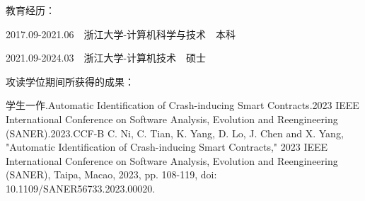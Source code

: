 \cleardoublepage
{}


\noindent 教育经历： 

2017.09-2021.06\ \ 浙江大学-计算机科学与技术\ \ 本科 

2021.09-2024.03\ \ 浙江大学-计算机技术\ \ 硕士 
 
\hspace*{\fill}
\hspace*{\fill}
 
\noindent 攻读学位期间所获得的成果：

{%
学生一作.Automatic Identification of Crash-inducing Smart Contracts.2023 IEEE International Conference on Software Analysis, Evolution and Reengineering (SANER).2023.CCF-B
}
{%
C. Ni, C. Tian, K. Yang, D. Lo, J. Chen and X. Yang, "Automatic Identification of Crash-inducing Smart Contracts," 2023 IEEE International Conference on Software Analysis, Evolution and Reengineering (SANER), Taipa, Macao, 2023, pp. 108-119, doi: 10.1109/SANER56733.2023.00020.
}


